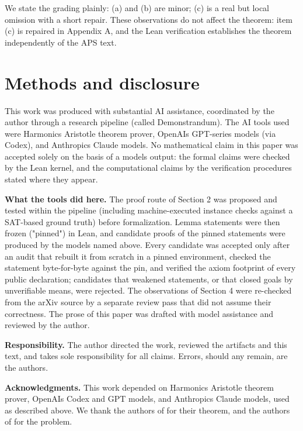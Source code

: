\documentclass[11pt]{article}
\theoremstyle{definition}
\theoremstyle{remark}
\begin{document}
We state the grading plainly: (a) and (b) are minor; (c) is a real but local omission with a short repair. These observations do not affect the theorem: item (c) is repaired in Appendix A, and the Lean verification establishes the theorem independently of the APS text.


\section{Methods and disclosure}\label{5-methods-and-disclosure}

This work was produced with substantial AI assistance, coordinated by the author through a research pipeline (called Demonstrandum). The AI tools used were Harmonic\textquotesingle s Aristotle theorem prover, OpenAI\textquotesingle s GPT-series models (via Codex), and Anthropic\textquotesingle s Claude models. No mathematical claim in this paper was accepted solely on the basis of a model\textquotesingle s output: the formal claims were checked by the Lean kernel, and the computational claims by the verification procedures stated where they appear.

\textbf{What the tools did here.} The proof route of Section 2 was proposed and tested within the pipeline (including machine-executed instance checks against a SAT-based ground truth) before formalization. Lemma statements were then frozen ("pinned") in Lean, and candidate proofs of the pinned statements were produced by the models named above. Every candidate was accepted only after an audit that rebuilt it from scratch in a pinned environment, checked the statement byte-for-byte against the pin, and verified the axiom footprint of every public declaration; candidates that weakened statements, or that closed goals by unverifiable means, were rejected. The observations of Section 4 were re-checked from the arXiv source by a separate review pass that did not assume their correctness. The prose of this paper was drafted with model assistance and reviewed by the author.

\textbf{Responsibility.} The author directed the work, reviewed the artifacts and this text, and takes sole responsibility for all claims. Errors, should any remain, are the author\textquotesingle s.

\textbf{Acknowledgments.} This work depended on Harmonic\textquotesingle s Aristotle theorem prover, OpenAI\textquotesingle s Codex and GPT models, and Anthropic\textquotesingle s Claude models, used as described above. We thank the authors of \cite{APS} for their theorem, and the authors of \cite{KKPW} for the problem.
\end{document}
